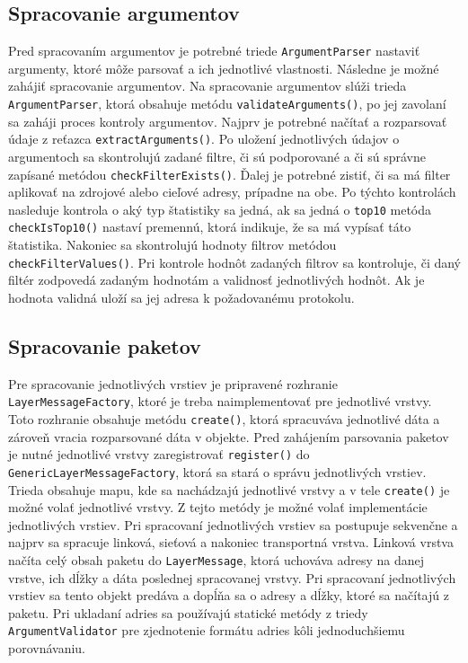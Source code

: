 \documentclass[10pt,a4paper,final]{article}
\begin{document}
\subsection{Spracovanie argumentov}
Pred spracovaním argumentov je potrebné triede \texttt{ArgumentParser} nastaviť argumenty, ktoré môže parsovať a ich jednotlivé vlastnosti. Následne je možné zahájiť spracovanie argumentov. 
Na spracovanie argumentov slúži trieda \texttt{ArgumentParser}, ktorá obsahuje metódu \texttt{validateArguments()}, po jej zavolaní sa zaháji proces kontroly argumentov. Najprv je potrebné načítať a rozparsovať údaje z reťazca \texttt{extractArguments()}. Po uložení jednotlivých údajov o argumentoch sa skontrolujú zadané filtre, či sú podporované a či sú správne zapísané metódou \texttt{checkFilterExists()}. Ďalej je potrebné zistiť, či sa má filter aplikovať na zdrojové alebo cieľové adresy, prípadne na obe. Po týchto kontrolách nasleduje kontrola o aký typ štatistiky sa jedná, ak sa jedná o \texttt{top10} metóda \texttt{checkIsTop10()} nastaví premennú, ktorá indikuje, že sa má vypísať táto štatistika. Nakoniec sa skontrolujú hodnoty filtrov metódou \texttt{checkFilterValues()}. Pri kontrole hodnôt zadaných filtrov sa kontroluje, či daný filtér zodpovedá zadaným hodnotám a validnosť jednotlivých hodnôt. Ak je hodnota validná uloží sa jej adresa k požadovanému protokolu.


\subsection{Spracovanie paketov}
Pre spracovanie jednotlivých vrstiev je pripravené rozhranie \texttt{LayerMessageFactory}, ktoré je treba naimplementovať pre jednotlivé vrstvy. Toto rozhranie obsahuje metódu \texttt{create()}, ktorá spracuváva jednotlivé dáta a zároveň vracia rozparsované dáta v objekte. Pred zahájením parsovania paketov je nutné jednotlivé vrstvy zaregistrovať \texttt{register()} do \texttt{GenericLayerMessageFactory}, ktorá sa stará o správu jednotlivých vrstiev. Trieda obsahuje mapu, kde sa nachádzajú jednotlivé vrstvy a v tele \texttt{create()} je možné volať jednotlivé vrstvy. Z tejto metódy je možné volať implementácie jednotlivých vrstiev. Pri spracovaní jednotlivých vrstiev sa postupuje sekvenčne a najprv sa spracuje linková, sieťová a nakoniec transportná vrstva. Linková vrstva načíta celý obsah paketu do \texttt{LayerMessage}, ktorá uchováva adresy na danej vrstve, ich dĺžky a dáta poslednej spracovanej vrstvy. Pri spracovaní jednotlivých vrstiev sa tento objekt predáva a dopĺňa sa o adresy a dĺžky, ktoré sa načítajú z paketu. Pri ukladaní adries sa používajú statické metódy z triedy \texttt{ArgumentValidator} pre zjednotenie formátu adries kôli jednoduchšiemu porovnávaniu. 
\end{document}
